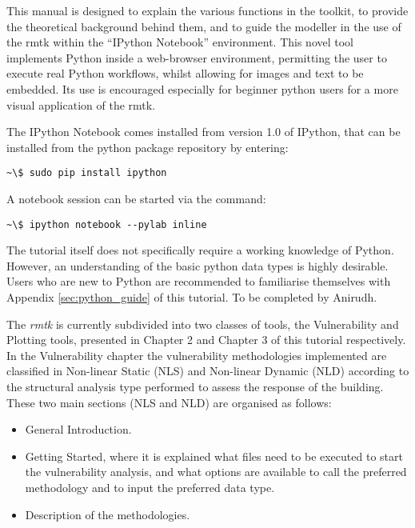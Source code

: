 This manual is designed to explain the various functions in the toolkit, to provide the theoretical background behind them, and to guide the modeller in the use of the rmtk within the ``IPython Notebook'' environment. This novel tool implements Python inside a web-browser environment, permitting the user to execute real Python workflows, whilst allowing for images and text to be embedded. Its use is encouraged especially for beginner python users for a more visual application of the rmtk.

The IPython Notebook  comes installed from version 1.0 of IPython, that can be installed from the python package repository by entering:

\begin{Verbatim}[frame=single, commandchars=\\\{\}, samepage=true]
~\$ sudo pip install ipython
\end{Verbatim}

A notebook session can be started via the command:

\begin{Verbatim}[frame=single, commandchars=\\\{\}, samepage=true]
~\$ ipython notebook --pylab inline
\end{Verbatim}

The tutorial itself does not specifically require a working knowledge of Python. However, an understanding of the basic python data types is highly desirable. Users who are new to Python are recommended to familiarise themselves with Appendix \ref{sec:python_guide} of this tutorial.
To be completed by Anirudh.

The \textit{rmtk} is currently subdivided into two classes of tools, the Vulnerability and Plotting tools, presented in Chapter 2 and Chapter 3 of this tutorial respectively. In the Vulnerability chapter the vulnerability methodologies implemented are classified in Non-linear Static (NLS) and Non-linear Dynamic (NLD) according to the structural analysis type performed to assess the response of the building. These two main sections (NLS and NLD) are organised as follows:

\begin{itemize}
\item General Introduction.
\item Getting Started, where it is explained what files need to be executed to start the vulnerability analysis, and what options are available to call the preferred methodology and to input the preferred data type.
\item Description of the methodologies.
\end{itemize}

